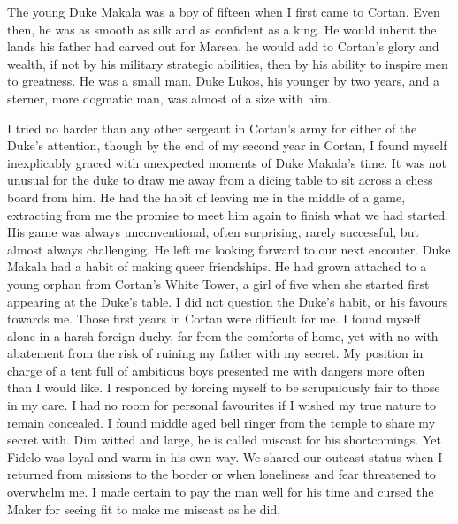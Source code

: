 \documentclass{article}
\begin{document}
The young Duke Makala was a boy of fifteen when I first came to Cortan. Even then, he was as smooth as silk and  as confident as a king. He would inherit the lands his father had carved out for Marsea, he would add to Cortan's glory and wealth, if not by his military strategic abilities, then by his ability to inspire men to greatness. He was a small man. Duke Lukos, his younger by two years, and a sterner, more dogmatic man, was almost of a size with him.

I tried no harder than any other sergeant in Cortan's army for either of the Duke's attention, though by the end of my second year in Cortan, I found myself inexplicably graced with unexpected moments of Duke Makala's time. It was not unusual for the duke to draw me away from a dicing table to sit across a chess board from him. He had the habit of leaving me in the middle of a game, extracting from me the promise to meet him again to finish what we had started. His game was always unconventional, often surprising, rarely successful, but almost always challenging. He left me looking forward to our next encouter. Duke Makala had a habit of making queer friendships. He had grown attached to a young orphan from Cortan's White Tower, a girl of five when she started first appearing at the Duke's table. I did not question the Duke's habit, or his favours towards me. Those first years in Cortan were difficult for me. I found myself alone in a harsh foreign duchy, far from the comforts of home, yet with no with abatement from the risk of ruining my father with my secret. My position in charge of a tent full of ambitious boys presented me with dangers more often than I would like. I responded by forcing myself to be scrupulously fair to those in my care. I had no room for personal favourites if I wished my true nature to remain concealed. I found middle aged bell ringer from the temple to share my secret with. Dim witted and large, he is called miscast for his shortcomings. Yet Fidelo was loyal and warm in his own way. We shared our outcast status when I returned from missions to the border or when loneliness and fear threatened to overwhelm me. I made certain to pay the man well for his time and cursed the Maker for seeing fit to make me miscast as he did.
\end{document}
